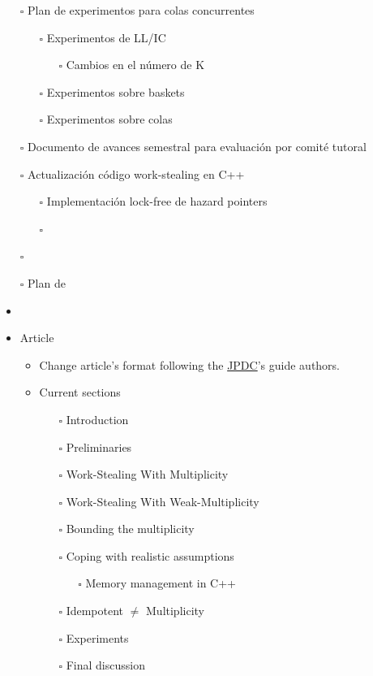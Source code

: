 \documentclass[openany, a4paper]{book}
\theoremstyle{break}
\theoremstyle{example}
\theoremstyle{note}
\theoremstyle{break}
\theoremstyle{exercise}
\begin{document}
\begin{itemize}
\item[{$\square$}] Plan de experimentos para colas concurrentes
\begin{itemize}
\item[{$\square$}] Experimentos de LL/IC
\begin{itemize}
\item[{$\square$}] Cambios en el número de K
\end{itemize}
\item[{$\square$}] Experimentos sobre baskets
\item[{$\square$}] Experimentos sobre colas
\end{itemize}
\item[{$\square$}] Documento de avances semestral para evaluación por comité tutoral
\item[{$\square$}] Actualización código work-stealing en C++
\begin{itemize}
\item[{$\square$}] Implementación lock-free de hazard pointers
\item[{$\square$}]
\end{itemize}
\item[{$\square$}]

\item[{$\square$}] Plan de
\item
\end{itemize}
\begin{itemize}
\item Article
\begin{itemize}
\item Change article's format following the \href{https://www.elsevier.com/journals/journal-of-parallel-and-distributed-computing/0743-7315/guide-for-authors}{JPDC}'s guide authors.
\item Current sections
\begin{itemize}
\item[{$\square$}] Introduction
\item[{$\square$}] Preliminaries
\item[{$\square$}] Work-Stealing With Multiplicity
\item[{$\square$}] Work-Stealing With Weak-Multiplicity
\item[{$\square$}] Bounding the multiplicity
\item[{$\square$}] Coping with realistic assumptions
\begin{itemize}
\item[{$\square$}] Memory management in C++
\end{itemize}
\item[{$\square$}] Idempotent \(\neq\) Multiplicity
\item[{$\square$}] Experiments
\item[{$\square$}] Final discussion
\end{itemize}
\end{itemize}
\end{itemize}
\end{document}
